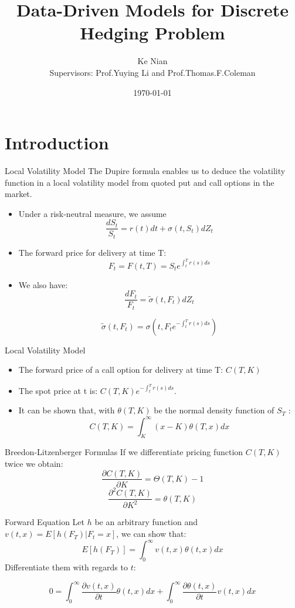 \documentclass[10pt,table,mathserif]{beamer}
\title[Data-Driven Models for Discrete
Hedging Problem ]%
{Data-Driven Models for   Discrete
Hedging Problem}
\author[Ke Nian ] %
{ Ke Nian\\
 Supervisors: Prof.Yuying Li and Prof.Thomas.F.Coleman
}
\institute[
  David R. Cheriton School of Computer Science, University of Waterloo
] %
{%
  David R. Cheriton School of Computer Science,\\
  University of Waterloo,\\
  Waterloo, Canada
}
\date{\today}
\begin{document}
\begin{frame}[plain] %
  \titlepage
\end{frame}


\section{Introduction}

\begin{frame}{Local Volatility Model}
The Dupire formula enables us to deduce the volatility function in a local volatility
model from quoted put and call options in the market. 
\begin{itemize}
  \item Under a risk-neutral measure, we assume 
\[
\frac{d S_t}{ S_t}= r(t) dt +\sigma(t,S_t) dZ_t
\]

 \item The forward price for delivery at time T:
\[
F_t = F(t, T) = S_t e^{\int^T_t r(s)ds}
\]
\item We also have:
\[
\frac{d F_t}{ F_t}=\widetilde{\sigma}(t,F_t)dZ_t
\]

\[
\widetilde{\sigma}(t,F_t)=\sigma(t, F_t e^{-\int^T_t r(s)ds})
\]
\end{itemize}
\end{frame}

\begin{frame}{Local Volatility Model}
\begin{itemize}
	\item The forward price of a call option for delivery at time T:	$C(T,K)$
	\item The spot price at t is: $C(T,K) e^{-\int^T_t r(s)ds}$.
	\item It can be shown that, with $\theta(T,K)$ be the normal density function of $S_T$ :
	\[
	C(T,K)=\int_{K}^{\infty} (x-K) \theta(T,x)dx
	\] 
\end{itemize}
\end{frame}

\begin{frame}{Breedon-Litzenberger Formulas}
	If we differentiate pricing function $C(T,K)$ twice we obtain:
	\[
	\frac{\partial C(T,K)}{ \partial K}= \Theta(T,K)-1
	\] 
	\[
	\frac{\partial^2 C(T,K)}{ \partial K^2}= \theta(T,K)
	\] 
\end{frame}

\begin{frame}{Forward Equation}
Let $h$ be an arbitrary function and $v(t,x)=E[h(F_T)|F_t=x]$, we can show that:
\[
E[h(F_T)]=\int_{0}^{\infty} v(t,x) \theta(t,x)dx
\]
Differentiate them with regards to $t$:

\[
0=\int_{0}^{\infty} \frac{\partial v(t,x)}{\partial t} \theta(t,x)dx+\int_{0}^{\infty} \frac{\partial \theta(t,x)}{\partial t} v(t,x)dx
\]
\end{frame}
\end{document}
